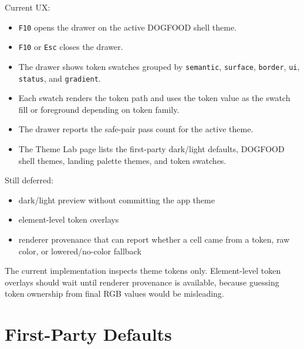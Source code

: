 Current UX:

\begin{itemize}
\tightlist
\item
  \texttt{F\allowbreak{}1\allowbreak{}0} opens the drawer on the active DOGFOOD shell theme.
\item
  \texttt{F\allowbreak{}1\allowbreak{}0} or \texttt{E\allowbreak{}s\allowbreak{}c} closes the drawer.
\item
  The drawer shows token swatches grouped by \texttt{s\allowbreak{}e\allowbreak{}m\allowbreak{}a\allowbreak{}n\allowbreak{}t\allowbreak{}i\allowbreak{}c}, \texttt{s\allowbreak{}u\allowbreak{}r\allowbreak{}f\allowbreak{}a\allowbreak{}c\allowbreak{}e}, \texttt{b\allowbreak{}o\allowbreak{}r\allowbreak{}d\allowbreak{}e\allowbreak{}r}, \texttt{u\allowbreak{}i}, \texttt{s\allowbreak{}t\allowbreak{}a\allowbreak{}t\allowbreak{}u\allowbreak{}s}, and \texttt{g\allowbreak{}r\allowbreak{}a\allowbreak{}d\allowbreak{}i\allowbreak{}e\allowbreak{}n\allowbreak{}t}.
\item
  Each swatch renders the token path and uses the token value as the swatch fill or foreground depending on token family.
\item
  The drawer reports the safe-pair pass count for the active theme.
\item
  The Theme Lab page lists the first-party dark/light defaults, DOGFOOD shell themes, landing palette themes, and token swatches.
\end{itemize}

Still deferred:

\begin{itemize}
\tightlist
\item
  dark/light preview without committing the app theme
\item
  element-level token overlays
\item
  renderer provenance that can report whether a cell came from a token, raw color, or lowered/no-color fallback
\end{itemize}

The current implementation inspects theme tokens only. Element-level token overlays should wait until renderer provenance is available, because guessing token ownership from final RGB values would be misleading.

\section{First-Party Defaults}\label{record-028-first-party-defaults}


